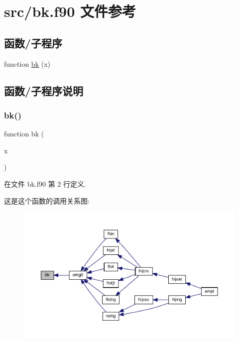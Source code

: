 \hypertarget{bk_8f90}{}\section{src/bk.f90 文件参考}
\label{bk_8f90}
\subsection*{函数/子程序}
\begin{DoxyCompactItemize}
\item 
function \mbox{\hyperlink{bk_8f90_a4afd5ddcdcb3568b628d2e68ade5e9d8}{bk}} (x)
\end{DoxyCompactItemize}


\subsection{函数/子程序说明}
\mbox{\label{bk_8f90_a4afd5ddcdcb3568b628d2e68ade5e9d8}} 
\subsubsection{\texorpdfstring{bk()}{bk()}}
{\footnotesize\ttfamily function bk (\begin{DoxyParamCaption}\item[{}]{x }\end{DoxyParamCaption})}



在文件 bk.\+f90 第 2 行定义.

这是这个函数的调用关系图\+:
\nopagebreak
\begin{figure}[H]
\begin{center}
\leavevmode
\includegraphics[width=350pt]{bk_8f90_a4afd5ddcdcb3568b628d2e68ade5e9d8_icgraph}
\end{center}
\end{figure}
